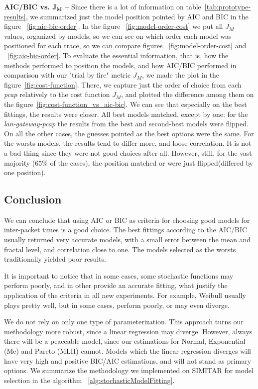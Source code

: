 \textbf{AIC/BIC vs. $\mathbf{J_M}$ --} Since there is a lot of information on table~\ref{tab:prototype-results}, we summarized just the model position pointed by AIC and BIC in the figure ~\ref{fig:aic-bic-order}. In the figure ~\ref{fig:model-order-cost} we put all $J_M$ values, organized by models, so we can see on which order each model was positioned for each trace, so we can compare  figures ~\ref{fig:model-order-cost} and  ~\ref{fig:aic-bic-order}. To evaluate the essential information, that is, how the methods performed to position the models, and how AIC/BIC performed in comparison with our "trial by fire" metric $J_M$, we made the plot in the figure~\ref{fig:cost-function}. There, we capture just the order of choice from each \textit{pcap} relatively to the cost function $J_M$, and plotted the difference among them on the figure~\ref{fig:cost-function_vs_aic-bic}. We can see that especially on the best fittings, the results were closer. All best models matched, except by one: for the \textit{lan-gateway-pcap} the results from the best and second-best models were flipped. On all the other cases, the guesses pointed as the best options were the same. For the worsts models, the results tend to differ more, and loose correlation. It is not a bad thing since they were not good choices after all. However, still, for the vast majority ($65\%$ of the cases), the position matched or were just flipped(differed by one position).


\subsection{Conclusion}


We can conclude that using AIC or BIC as criteria for choosing good models for inter-packet times is a good choice. The best fittings according to the AIC/BIC usually returned very accurate models, with a small error between the mean and fractal level, and correlation close to one. The models selected as the worsts traditionally yielded poor results.

It is important to notice that in some cases, some stochastic functions may perform poorly, and in other provide an accurate fitting, what justify the application of the criteria in all new experiments. For example, Weibull usually plays pretty well, but in some cases, perform poorly, or may even diverge. 

We do not rely on only one type of parameterization. This approach turns our methodology more robust, since a linear regression may diverge. However, always there will be a peaceable model, since our estimations for Normal, Exponential (Me) and Pareto (MLH) cannot. Models which the linear regression diverges will have very high and positive BIC/AIC estimations, and will not stand as primary options. We summarize the methodology we implemented on SIMITAR for model selection in the algorithm ~\ref{alg:stochasticModelFitting}.

